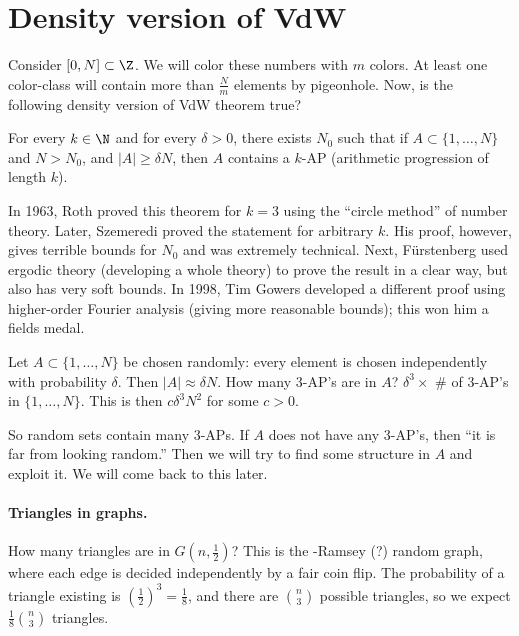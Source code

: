 

\section*{Density version of VdW}
Consider $[0,N]\subset \Z$. We will color these numbers with $m$ colors. At least one color-class will contain more than $\frac{N}{m}$ elements by pigeonhole. Now, is the following density version of VdW theorem true?

\begin{theorem}
\label{thm:density_VdW}
For every $k\in \N$ and for every $\delta>0$, there exists $N_0$ such that if $A\subset\{1,\dotsc,N\}$ and $N>N_0$, and $|A|\geq \delta N$, then $A$ contains a $k$-AP (arithmetic progression of length $k$).
\end{theorem}


In 1963, Roth proved this theorem for $k=3$ using the ``circle method'' of number theory. Later, Szemeredi proved the statement for arbitrary $k$. His proof, however, gives terrible bounds for $N_0$ and was extremely technical. Next, F\"urstenberg used ergodic theory (developing a whole theory) to prove the result in a clear way, but also has very soft bounds. In 1998, Tim Gowers developed a different proof using higher-order Fourier analysis (giving more reasonable bounds); this won him a fields medal.

Let $A\subset \{1,\dotsc,N\}$ be chosen randomly: every element is chosen independently with probability $\delta$.
Then $|A|\approx \delta N$. How many $3$-AP's are in $A$? $\delta^3 \times$ \# of $3$-AP's in $\{1,\dotsc,N\}$. This is then $c \delta^3 N^2$ for some $c>0$.

So random sets contain many $3$-APs. If $A$ does not have any 3-AP's, then ``it is far from looking random.'' Then we will try to find some structure in $A$ and exploit it. We will come back to this later.

\paragraph{Triangles in graphs.} How many triangles are in $G(n, \frac{1}{2})$? This is the \erdos-Ramsey (?) random graph, where each edge is decided independently by a fair coin flip. The probability of a triangle existing is $\left( \frac{1}{2} \right)^3 = \frac{1}{8}$, and there are ${n\choose 3}$ possible triangles, so we expect $\frac{1}{8}{n\choose 3}$ triangles.

